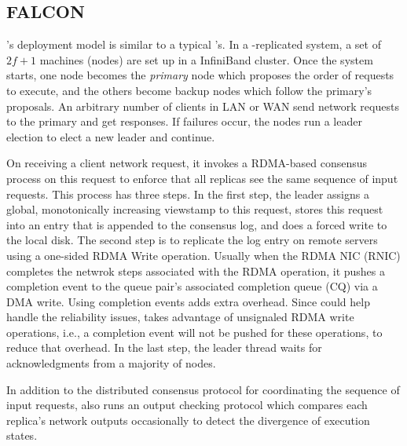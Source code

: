 \subsection{FALCON} \label{sec:falcon}

\smrsystem's deployment model is similar to a typical \smr's. In a \smrsystem-replicated 
system, a set of $2f+1$ machines (nodes) are set up in a InfiniBand cluster. Once the 
\smrsystem system starts, one node becomes the \emph{primary} node which proposes the order of 
requests to execute, and the others become backup nodes which follow the primary’s 
proposals. An arbitrary number of clients in LAN or WAN send network requests to the 
primary and get responses. If failures occur, the nodes run a leader election to elect 
a new leader and continue.

On receiving a client network request, it invokes a RDMA-based consensus process on this 
request to enforce that all replicas see the same sequence of input requests. This process 
has three steps. In the first step, the leader assigns a global, monotonically increasing 
viewstamp to this request, stores this request into an entry that is appended to the consensus 
log, and does a forced write to the local disk. The second step is to replicate the log entry 
on remote servers using a one-sided RDMA Write operation. Usually when the RDMA NIC (RNIC) 
completes the netwrok steps associated with the RDMA operation, it pushes a completion event 
to the queue pair's associated completion queue (CQ) via a DMA write. Using completion events 
adds extra overhead. Since \paxos could help handle the reliability issues, \smrsystem takes 
advantage of unsignaled RDMA write operations, i.e., a completion event will not be pushed for 
these operations, to reduce that overhead. In the last step, the leader thread waits for 
acknowledgments from a majority of nodes.

In addition to the distributed consensus protocol for coordinating the sequence of input requests, 
\smrsystem also runs an output checking protocol which compares each replica's network outputs 
occasionally to detect the divergence of execution states.
